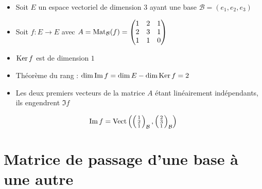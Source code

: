 \begin{frame}

\begin{exemple}

\begin{itemize}
  \item Soit $E$ un espace vectoriel de dimension $3$ ayant une base $\mathcal{B}=(e_1,e_2,e_3)$
  \item Soit $f : E \to E$ avec $A = \mathop{\text{Mat}}\nolimits_{\mathcal{B}} (f) =
\begin{pmatrix}
1&2&1\cr
2&3&1\cr
1&1&0\cr
\end{pmatrix}$
\end{itemize}


\pause

\begin{itemize}
  \item $\mathop{\text{Ker}}\nolimits f$ est de dimension $1$
  \pause
  \item Théorème du rang : $\dim \mathop{\text{Im}}\nolimits f = \dim E - \dim \mathop{\text{Ker}}\nolimits f = 2$
  \pause
  \item Les deux premiers vecteurs de la matrice $A$ étant linéairement indépendants, ils engendrent
$\Im f$
\end{itemize}

\pause

$$\mathop{\text{Im}}\nolimits f = \mathop{\text{Vect}}\nolimits \left(
\left(\begin{smallmatrix}1\\2\\1\end{smallmatrix}\right)_{\mathcal{B}},
\left(\begin{smallmatrix}2\\3\\1\end{smallmatrix}\right)_{\mathcal{B}}
\right)$$
\end{exemple}
\end{frame}


\section{Matrice de passage d'une base à une autre}

